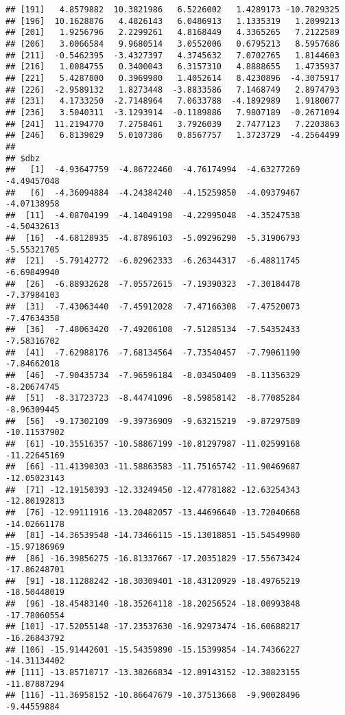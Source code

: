 \documentclass[]{article}
\begin{document}
\begin{verbatim}
## [191]   4.8579882  10.3821986   6.5226002   1.4289173 -10.7029325
## [196]  10.1628876   4.4826143   6.0486913   1.1335319   1.2099213
## [201]   1.9256796   2.2299261   4.8168449   4.3365265   7.2122589
## [206]   3.0066584   9.9680514   3.0552006   0.6795213   8.5957686
## [211]  -0.5462395  -3.4327397   4.3745632   7.0702765   1.8144603
## [216]   1.0084755   0.3400043   6.3157310   4.8888655   1.4735937
## [221]   5.4287800   0.3969980   1.4052614   8.4230896  -4.3075917
## [226]  -2.9589132   1.8273448  -3.8833586   7.1468749   2.8974793
## [231]   4.1733250  -2.7148964   7.0633788  -4.1892989   1.9180077
## [236]   3.5040311  -3.1293914  -0.1189886   7.9807189  -0.2671094
## [241]  11.2194770   7.2758461   3.7926039   2.7477123   7.2203863
## [246]   6.8139029   5.0107386   0.8567757   1.3723729  -4.2564499
## 
## $dbz
##   [1]  -4.93647759  -4.86722460  -4.76174994  -4.63277269  -4.49457048
##   [6]  -4.36094884  -4.24384240  -4.15259850  -4.09379467  -4.07138958
##  [11]  -4.08704199  -4.14049198  -4.22995048  -4.35247538  -4.50432613
##  [16]  -4.68128935  -4.87896103  -5.09296290  -5.31906793  -5.55321705
##  [21]  -5.79142772  -6.02962333  -6.26344317  -6.48811745  -6.69849940
##  [26]  -6.88932628  -7.05572615  -7.19390323  -7.30184478  -7.37984103
##  [31]  -7.43063440  -7.45912028  -7.47166308  -7.47520073  -7.47634358
##  [36]  -7.48063420  -7.49206108  -7.51285134  -7.54352433  -7.58316702
##  [41]  -7.62988176  -7.68134564  -7.73540457  -7.79061190  -7.84662018
##  [46]  -7.90435734  -7.96596184  -8.03450409  -8.11356329  -8.20674745
##  [51]  -8.31723723  -8.44741096  -8.59858142  -8.77085284  -8.96309445
##  [56]  -9.17302109  -9.39736909  -9.63215219  -9.87297589 -10.11537902
##  [61] -10.35516357 -10.58867199 -10.81297987 -11.02599168 -11.22645169
##  [66] -11.41390303 -11.58863583 -11.75165742 -11.90469687 -12.05023143
##  [71] -12.19150393 -12.33249450 -12.47781882 -12.63254343 -12.80192813
##  [76] -12.99111916 -13.20482057 -13.44696640 -13.72040668 -14.02661178
##  [81] -14.36539548 -14.73466115 -15.13018851 -15.54549980 -15.97186969
##  [86] -16.39856275 -16.81337667 -17.20351829 -17.55673424 -17.86248701
##  [91] -18.11288242 -18.30309401 -18.43120929 -18.49765219 -18.50448019
##  [96] -18.45483140 -18.35264118 -18.20256524 -18.00993848 -17.78060554
## [101] -17.52055148 -17.23537630 -16.92973474 -16.60688217 -16.26843792
## [106] -15.91442601 -15.54359890 -15.15399854 -14.74366227 -14.31134402
## [111] -13.85710717 -13.38266834 -12.89143152 -12.38823155 -11.87887294
## [116] -11.36958152 -10.86647679 -10.37513668  -9.90028496  -9.44559884

\end{verbatim}
\end{document}
